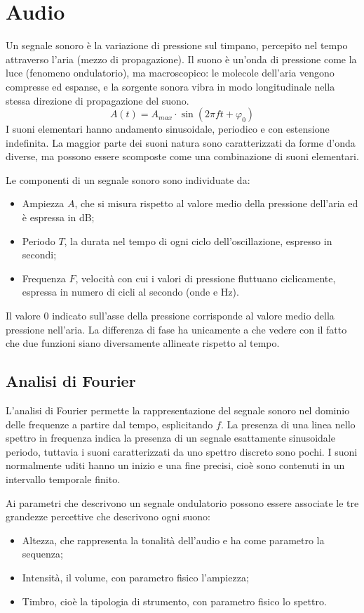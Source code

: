 \section{Audio}
Un segnale sonoro è la variazione di pressione sul timpano, percepito nel tempo attraverso l'aria (mezzo di propagazione). Il suono è un'onda di pressione come la luce (fenomeno ondulatorio), ma macroscopico: le molecole dell'aria vengono compresse ed espanse, e la sorgente sonora vibra in modo longitudinale nella stessa direzione di propagazione del suono.
$$A(t) = A_{max} \cdot \sin(2\pi ft + \varphi_0)$$
I suoni elementari hanno andamento sinusoidale, periodico e con estensione indefinita. La maggior parte dei suoni natura sono caratterizzati da forme d'onda diverse, ma possono essere scomposte come una combinazione di suoni elementari.

Le componenti di un segnale sonoro sono individuate da:
\begin{itemize}
	\item Ampiezza $A$, che si misura rispetto al valore medio della pressione dell'aria ed è espressa in dB;
	\item Periodo $T$, la durata nel tempo di ogni ciclo dell'oscillazione, espresso in secondi;
	\item Frequenza $F$, velocità con cui i valori di pressione fluttuano ciclicamente, espressa in numero di cicli al secondo (onde e Hz).
\end{itemize}

Il valore 0 indicato sull'asse della pressione corrisponde al valore medio della pressione nell'aria. La differenza di fase ha unicamente a che vedere con il fatto che due funzioni siano diversamente allineate rispetto al tempo.

\subsection{Analisi di Fourier}
L'analisi di Fourier permette la rappresentazione del segnale sonoro nel dominio delle frequenze a partire dal tempo, esplicitando $f$.
La presenza di una linea nello spettro in frequenza indica la presenza di un segnale esattamente sinusoidale periodo, tuttavia i suoni caratterizzati da uno spettro discreto sono pochi. I suoni normalmente uditi hanno un inizio e una fine precisi, cioè sono contenuti in un intervallo temporale finito.

Ai parametri che descrivono un segnale ondulatorio possono essere associate le tre grandezze percettive che descrivono ogni suono:
\begin{itemize}
	\item Altezza, che rappresenta la tonalità dell'audio e ha come parametro la sequenza;
	\item Intensità, il volume, con parametro fisico l'ampiezza;
	\item Timbro, cioè la tipologia di strumento, con parametro fisico lo spettro.
\end{itemize}

